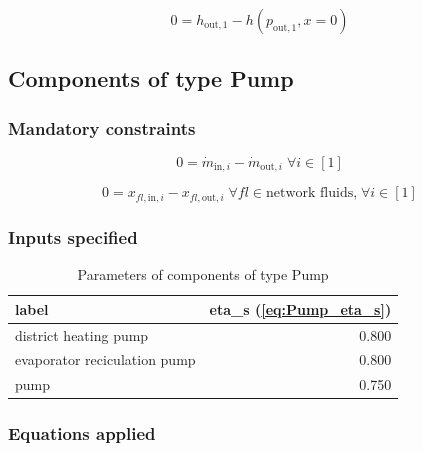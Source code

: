 \begin{equation}
\label{eq:Condenser_subcooling}
0=h_\mathrm{out,1} -h\left(p_\mathrm{out,1}, x=0 \right)
\end{equation}


\subsection{Components of type Pump}

\subsubsection{Mandatory constraints}

\begin{equation}
\label{eq:Pump_mass_flow_constraints}
0=\dot{m}_{\mathrm{in,}i}-\dot{m}_{\mathrm{out,}i}\; \forall i \in [1]
\end{equation}

\begin{equation}
\label{eq:Pump_fluid_constraints}
0=x_{fl\mathrm{,in,}i}-x_{fl\mathrm{,out,}i}\;\forall fl \in\text{network fluids,}\; \forall i \in [1]
\end{equation}


\subsubsection{Inputs specified}

\begin{table}[H]\begin{center}
\begin{tabular}{lr}
\toprule
                        label &  eta\_s (\ref{eq:Pump_eta_s}) \\
\midrule
        district heating pump &                         0.800 \\
 evaporator reciculation pump &                         0.800 \\
                         pump &                         0.750 \\
\bottomrule
\end{tabular}
\caption{Parameters of components of type Pump}
\end{center}\end{table}

\subsubsection{Equations applied}

